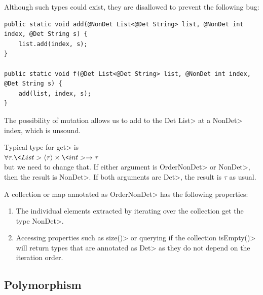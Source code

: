  Although such types could exist, they are
disallowed to prevent the following bug:

\begin{verbatim}
public static void add(@NonDet List<@Det String> list, @NonDet int index, @Det String s) {
    list.add(index, s);
}

public static void f(@Det List<@Det String> list, @NonDet int index, @Det String s) {
    add(list, index, s);
}
\end{verbatim}

The possibility of mutation allows us to add to the \<Det List> at a
\<NonDet> index, which is unsound.

Typical type for \<get> is \\
$\forall \tau . \<List>\angles{\tau} \times \<int> \rightarrow \tau$ \\
but we need to change that.  If either argument is \<OrderNonDet> or \<NonDet>, then the
result is \<NonDet>.
If both arguments are \<Det>, the result is $\tau$ as usual.





A collection or map annotated as \<OrderNonDet> has the following properties:
\begin{enumerate}
    \item The individual elements extracted by iterating over the collection get the type \<NonDet>.
    \item Accessing properties such as \<size()> or querying if the collection \<isEmpty()> will return types
    that are annotated as \<Det> as they do not depend on the iteration order. 
\end{enumerate}



\subsection{Polymorphism}\label{polymorphism}

